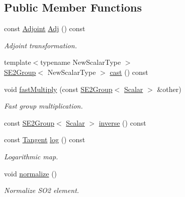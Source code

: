 \subsection*{Public Member Functions}
\begin{DoxyCompactItemize}
\item 
const \hyperlink{class_sophus_1_1_s_e2_group_base_a6e0785a6f8399456a8bd0b057bae02ee}{Adjoint} \hyperlink{class_sophus_1_1_s_e2_group_base_a83dd17e9837363469bbe32ec202cebe5}{Adj} () const 
\begin{DoxyCompactList}\small\item\em Adjoint transformation. \end{DoxyCompactList}\item 
{\footnotesize template$<$typename New\+Scalar\+Type $>$ }\\\hyperlink{class_sophus_1_1_s_e2_group}{S\+E2\+Group}$<$ New\+Scalar\+Type $>$ \hyperlink{class_sophus_1_1_s_e2_group_base_a84e3ce985f4afb7982c2739e2284a276}{cast} () const 
\item 
void \hyperlink{class_sophus_1_1_s_e2_group_base_a51db3eccd7b70627974e9e0f4ba0e0b1}{fast\+Multiply} (const \hyperlink{class_sophus_1_1_s_e2_group}{S\+E2\+Group}$<$ \hyperlink{class_sophus_1_1_s_e2_group_base_a1bad7970c24437df7f4a34281ff147fe}{Scalar} $>$ \&other)
\begin{DoxyCompactList}\small\item\em Fast group multiplication. \end{DoxyCompactList}\item 
const \hyperlink{class_sophus_1_1_s_e2_group}{S\+E2\+Group}$<$ \hyperlink{class_sophus_1_1_s_e2_group_base_a1bad7970c24437df7f4a34281ff147fe}{Scalar} $>$ \hyperlink{class_sophus_1_1_s_e2_group_base_a5c9d9485f696396266bd7932d38d7c90}{inverse} () const 
\item 
const \hyperlink{class_sophus_1_1_s_e2_group_base_a71b41e6cde48514241c7bffcbe34923f}{Tangent} \hyperlink{class_sophus_1_1_s_e2_group_base_a32855c8b44ed62a108281a99b7589007}{log} () const 
\begin{DoxyCompactList}\small\item\em Logarithmic map. \end{DoxyCompactList}\item 
void \hyperlink{class_sophus_1_1_s_e2_group_base_aa53b166d7053572efeb5b77a08834156}{normalize} ()
\begin{DoxyCompactList}\small\item\em Normalize S\+O2 element. \end{DoxyCompactList}\item 

\end{DoxyCompactItemize}
